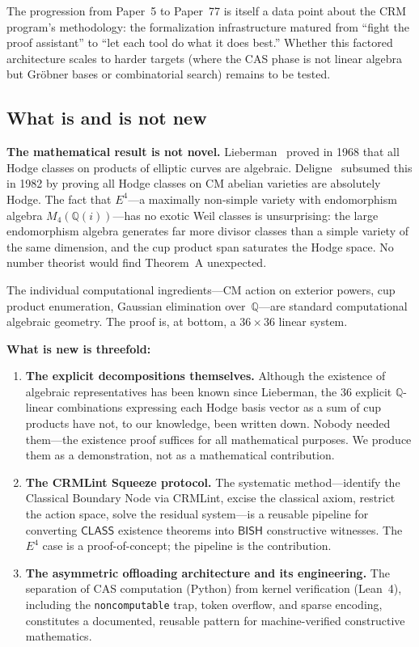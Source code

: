 \documentclass[11pt]{article}
\theoremstyle{plain}
\theoremstyle{definition}
\theoremstyle{remark}
\newcommand{\Q}{\mathbb{Q}}
\newcommand{\BISH}{\mathsf{BISH}}
\newcommand{\CLASS}{\mathsf{CLASS}}
\begin{document}
\noindent
The progression from Paper~5 to Paper~77 is itself a data point
about the CRM program's methodology: the formalization
infrastructure matured from ``fight the proof assistant'' to
``let each tool do what it does best.''  Whether this
factored architecture scales to harder targets (where the
CAS phase is not linear algebra but Gr\"obner bases or
combinatorial search) remains to be tested.

\subsection{What is and is not new}\label{sec:whatsnew}

\textbf{The mathematical result is not novel.}
Lieberman~\cite{Lieberman1968} proved in 1968 that all Hodge
classes on products of elliptic curves are algebraic.
Deligne~\cite{Deligne1982} subsumed this in 1982 by proving
all Hodge classes on CM abelian varieties are absolutely Hodge.
The fact that $E^4$---a maximally non-simple variety with
endomorphism algebra $M_4(\Q(i))$---has no exotic Weil classes
is unsurprising: the large endomorphism algebra generates
far more divisor classes than a simple variety of the same
dimension, and the cup product span saturates the Hodge space.
No number theorist would find Theorem~A unexpected.

The individual computational ingredients---CM action on
exterior powers, cup product enumeration, Gaussian elimination
over~$\Q$---are standard computational algebraic geometry.
The proof is, at bottom, a $36 \times 36$ linear system.

\medskip\noindent
\textbf{What is new is threefold:}

\begin{enumerate}[nosep]
\item \textbf{The explicit decompositions themselves.}  Although
  the existence of algebraic representatives has been known since
  Lieberman, the 36 explicit $\Q$-linear combinations expressing
  each Hodge basis vector as a sum of cup products have not, to our
  knowledge, been written down.  Nobody needed them---the
  existence proof suffices for all mathematical purposes.  We
  produce them as a demonstration, not as a mathematical
  contribution.
\item \textbf{The CRMLint Squeeze protocol.}  The systematic
  method---identify the Classical Boundary Node via CRMLint,
  excise the classical axiom, restrict the action space, solve the
  residual system---is a reusable pipeline for converting
  $\CLASS$ existence theorems into $\BISH$ constructive
  witnesses.  The $E^4$ case is a proof-of-concept; the pipeline
  is the contribution.
\item \textbf{The asymmetric offloading architecture and its
  engineering.}  The separation of CAS computation (Python) from
  kernel verification (Lean~4), including the
  \texttt{noncomputable} trap, token overflow, and sparse encoding,
  constitutes a documented, reusable pattern for machine-verified
  constructive mathematics.
\end{enumerate}
\end{document}
